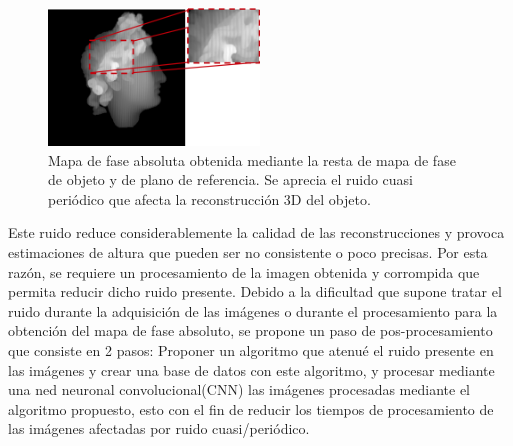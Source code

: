 \documentclass[10pt,letterpaper]{article}
\begin{document}
\begin{figure}[H]
	\centering
    \includegraphics[width=0.5\textwidth]{tifs/tif16.png}
    \caption{Mapa de fase absoluta obtenida mediante la resta de mapa de fase de objeto y de plano de referencia. Se aprecia el ruido cuasi periódico que afecta la reconstrucción 3D del objeto.}
    \label{tif16}
\end{figure}

Este ruido reduce considerablemente la calidad de las reconstrucciones y provoca estimaciones de altura que pueden ser no consistente o poco precisas. Por esta razón, se requiere un procesamiento de la imagen obtenida y corrompida que permita reducir dicho ruido presente. Debido a la dificultad que supone tratar el ruido durante la adquisición de las imágenes o durante el procesamiento para la obtención del mapa de fase absoluto, se propone un paso de pos-procesamiento que consiste en 2 pasos: Proponer un algoritmo que atenué el ruido presente en las imágenes y crear una base de datos con este algoritmo, y procesar mediante una ned neuronal convolucional(CNN) las imágenes procesadas mediante el algoritmo propuesto, esto con el fin de reducir los tiempos de procesamiento de las imágenes afectadas por ruido cuasi/periódico.
\end{document}
